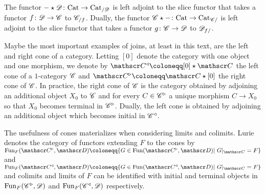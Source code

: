 \documentclass[../../thesis.tex]{subfiles}
\begin{document}
\begin{remark}
    The functor ${-} \star \mathscr{D} \colon \mathrm{Cat} \to \mathrm{Cat}_{/\mathscr{D}}$ is left adjoint to the slice functor that takes a functor $f \colon \mathscr{D} \to \mathscr{C}$ to $\mathscr{C}_{/f}$.
    Dually, the functor $\mathscr{C} \star {-} \colon \mathrm{Cat} \to \mathrm{Cat}_{\mathscr{C}/}$ is left adjoint to the slice functor that takes a functor $g \colon \mathscr{C} \to \mathscr{D}$ to $\mathscr{D}_{f/}$.
\end{remark}
\begin{example}
    Maybe the most important examples of joins, at least in this text, are the left and right cone of a category.
    Letting $[0]$ denote the category with one object and one morphism, we denote by $\C^{\triangleleft}\coloneqq [0] \star \C$ the left cone of a $1$-category $\mathscr{C}$ and $\C^{\triangleright}\coloneqq\C \star [0]$ the right cone of $\mathscr{C}$.
    In practice, the right cone of $\mathscr{C}$ is the category obtained by adjoining an additional object $X_0$ to $\mathscr{C}$ and for every $C \in \mathscr{C}^{\triangleright}$ a unique morphism $C \to X_0$ so that $X_0$ becomes terminal in $\mathscr{C}^{\triangleright}$.
    Dually, the left cone is obtained by adjoining an additional object which becomes initial in $\mathscr{C}^{\triangleleft}$.
\end{example}
The usefulness of cones materializes when considering limits and colimits.
Lurie denotes the category of functors extending $F$ to the cones by $\Fun_F(\C^{\triangleright}, \D) \coloneqq \{G \in \Fun(\C^{\triangleright}, \D) | G|_{\C} = F\}$ and $\Fun_F(\C^{\triangleleft}, \D)\coloneqq \{G \in \Fun(\C^{\triangleleft}, \D) | G|_{\C} = F\}$ and colimits and limits of $F$ can be identified with initial and terminal objects in $\mathrm{Fun}_F(\mathscr{C}^{\triangleright}, \mathscr{D})$ and $\mathrm{Fun}_F(\mathscr{C}^{\triangleleft}, \mathscr{D})$ respectively.
\end{document}
